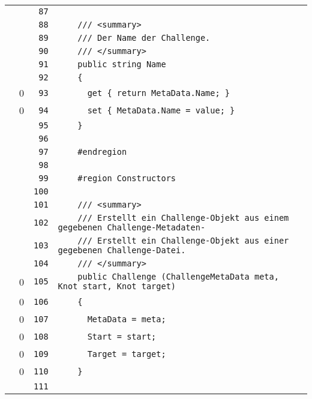 \documentclass[a4paper,10pt]{article}
\begin{document}
\begin{longtable}[l]{lrrl}
\cellcolor{gray} &  & \verb~87~ & \verb~~\\
\cellcolor{gray} &  & \verb~88~ & \verb~    /// <summary>~\\
\cellcolor{gray} &  & \verb~89~ & \verb~    /// Der Name der Challenge.~\\
\cellcolor{gray} &  & \verb~90~ & \verb~    /// </summary>~\\
\cellcolor{gray} &  & \verb~91~ & \verb~    public string Name~\\
\cellcolor{gray} &  & \verb~92~ & \verb~    {~\\
\cellcolor{red} & 0 & \verb~93~ & \verb~      get { return MetaData.Name; }~\\
\cellcolor{red} & 0 & \verb~94~ & \verb~      set { MetaData.Name = value; }~\\
\cellcolor{gray} &  & \verb~95~ & \verb~    }~\\
\cellcolor{gray} &  & \verb~96~ & \verb~~\\
\cellcolor{gray} &  & \verb~97~ & \verb~    #endregion~\\
\cellcolor{gray} &  & \verb~98~ & \verb~~\\
\cellcolor{gray} &  & \verb~99~ & \verb~    #region Constructors~\\
\cellcolor{gray} &  & \verb~100~ & \verb~~\\
\cellcolor{gray} &  & \verb~101~ & \verb~    /// <summary>~\\
\cellcolor{gray} &  & \verb~102~ & \verb~    /// Erstellt ein Challenge-Objekt aus einem gegebenen Challenge-Metadaten-~\\
\cellcolor{gray} &  & \verb~103~ & \verb~    /// Erstellt ein Challenge-Objekt aus einer gegebenen Challenge-Datei.~\\
\cellcolor{gray} &  & \verb~104~ & \verb~    /// </summary>~\\
\cellcolor{red} & 0 & \verb~105~ & \verb~    public Challenge (ChallengeMetaData meta, Knot start, Knot target)~\\
\cellcolor{red} & 0 & \verb~106~ & \verb~    {~\\
\cellcolor{red} & 0 & \verb~107~ & \verb~      MetaData = meta;~\\
\cellcolor{red} & 0 & \verb~108~ & \verb~      Start = start;~\\
\cellcolor{red} & 0 & \verb~109~ & \verb~      Target = target;~\\
\cellcolor{red} & 0 & \verb~110~ & \verb~    }~\\
\cellcolor{gray} &  & \verb~111~ & \verb~~\\

\end{longtable}
\end{document}
